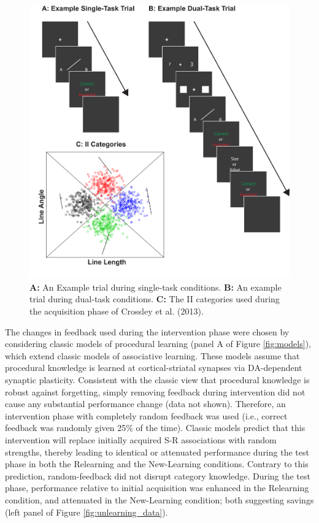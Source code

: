 \documentclass[man,apacite,draftfirst]{apa6}
\begin{document}
\begin{figure}[t]
  \centering \includegraphics[width=1.0\textwidth]{../figures/fig_trials.pdf}
  \caption{
    \textbf{A:} An Example trial during single-task conditions.
    \textbf{B:} An example trial during dual-task conditions.
    \textbf{C:} The II categories used during the acquisition phase of
    Crossley et al. (2013).
  }
  \label{fig:test_cats}
\end{figure}

The changes in feedback used during the intervention phase were chosen by
considering classic models of procedural learning (panel A of Figure
\ref{fig:models}), which extend classic models of associative learning.
These models assume that procedural knowledge is learned at cortical-striatal
synapses via DA-dependent synaptic plasticity. Consistent with the classic view
that procedural knowledge is robust against forgetting, simply removing feedback
during intervention did not cause any substantial performance change (data not
shown). Therefore, an intervention phase with completely random feedback was
used (i.e., correct feedback was randomly given 25\% of the time). Classic
models predict that this intervention will replace initially acquired S-R
associations with random strengths, thereby leading to identical or attenuated
performance during the test phase in both the Relearning and the New-Learning
conditions. Contrary to this prediction, random-feedback did not disrupt category knowledge. During the test phase, performance relative to initial acquisition was enhanced in the Relearning condition, and attenuated in the New-Learning condition; both suggesting savings
(left panel of Figure \ref{fig:unlearning_data}).
\end{document}
